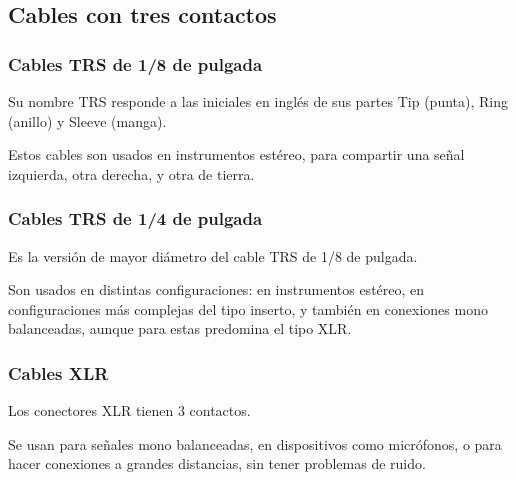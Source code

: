 \documentclass[../candidatura.tex]{subfiles}
\begin{document}
\subsection{Cables con tres contactos}

\subsubsection{Cables TRS de 1/8 de pulgada}

Su nombre TRS responde a las iniciales en inglés de sus partes Tip (punta), Ring (anillo) y Sleeve (manga).

Estos cables son usados en instrumentos estéreo, para compartir una señal izquierda, otra derecha, y otra de tierra.

\subsubsection{Cables TRS de 1/4 de pulgada}

Es la versión de mayor diámetro del cable TRS de 1/8 de pulgada.

Son usados en distintas configuraciones: en instrumentos estéreo, en configuraciones más complejas del tipo inserto, y también en conexiones mono balanceadas, aunque para estas predomina el tipo XLR.

\subsubsection{Cables XLR}

Los conectores XLR tienen 3 contactos.

Se usan para señales mono balanceadas, en dispositivos como micrófonos, o para hacer conexiones a grandes distancias, sin tener problemas de ruido.

\newpage
\end{document}
